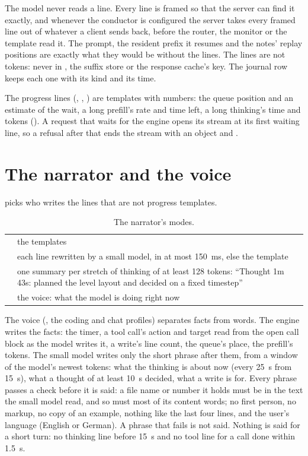 The model never reads a line. Every line is framed so that the server can find it exactly, and whenever the conductor is configured the server takes every framed line out of whatever a client sends back, before the router, the monitor or the template read it. The prompt, the resident prefix it resumes and the notes' replay positions are exactly what they would be without the lines. The lines are not tokens: never in , the suffix store or the response cache's key. The journal row keeps each one with its kind and its time.

The progress lines (, , ) are templates with numbers: the queue position and an estimate of the wait, a long prefill's rate and time left, a long thinking's time and tokens (). A request that waits for the engine opens its stream at its first waiting line, so a refusal after that ends the stream with an  object and \code{[DONE]}.

\section{The narrator and the voice}

 picks who writes the lines that are not progress templates.

\begin{table}[htbp]
\centering\small
\caption{The narrator's modes.}\label{tab:narrator-modes}
\begin{tabularx}{\linewidth}{@{}L{.12\linewidth}Y@{}}
\toprule
{} &  \\
\midrule
{} & the templates \\
 & each line rewritten by a small model, in at most 150~ms, else the template \\
 & one summary per stretch of thinking of at least 128 tokens: \enquote{Thought 1m 43s: planned the level layout and decided on a fixed timestep} \\
 & the voice: what the model is doing right now \\
\bottomrule
\end{tabularx}
\end{table}

The voice (, the coding and chat profiles) separates facts from words. The engine writes the facts: the timer, a tool call's action and target read from the open call block as the model writes it, a write's line count, the queue's place, the prefill's tokens. The small model writes only the short phrase after them, from a window of the model's newest tokens: what the thinking is about now (every 25~s from 15~s), what a thought of at least 10~s decided, what a write is for. Every phrase passes a check before it is said: a file name or number it holds must be in the text the small model read, and so must most of its content words; no first person, no markup, no copy of an example, nothing like the last four lines, and the user's language (English or German). A phrase that fails is not said. Nothing is said for a short turn: no thinking line before 15~s and no tool line for a call done within 1.5~s.

